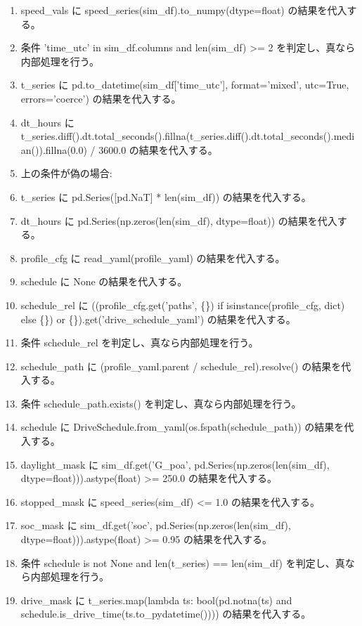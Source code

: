 \documentclass[a4paper,11pt]{article}
\begin{document}
            \begin{enumerate}[leftmargin=1.8em]
            \item speed\_vals に speed\_series(sim\_df).to\_numpy(dtype=float) の結果を代入する。
\item 条件 'time\_utc' in sim\_df.columns and len(sim\_df) >= 2 を判定し、真なら内部処理を行う。
\item   t\_series に pd.to\_datetime(sim\_df['time\_utc'], format='mixed', utc=True, errors='coerce') の結果を代入する。
\item   dt\_hours に t\_series.diff().dt.total\_seconds().fillna(t\_series.diff().dt.total\_seconds().median()).fillna(0.0) / 3600.0 の結果を代入する。
\item   上の条件が偽の場合:
\item   t\_series に pd.Series([pd.NaT] * len(sim\_df)) の結果を代入する。
\item   dt\_hours に pd.Series(np.zeros(len(sim\_df), dtype=float)) の結果を代入する。
\item profile\_cfg に read\_yaml(profile\_yaml) の結果を代入する。
\item schedule に None の結果を代入する。
\item schedule\_rel に ((profile\_cfg.get('paths', \{\}) if isinstance(profile\_cfg, dict) else \{\}) or \{\}).get('drive\_schedule\_yaml') の結果を代入する。
\item 条件 schedule\_rel を判定し、真なら内部処理を行う。
\item   schedule\_path に (profile\_yaml.parent / schedule\_rel).resolve() の結果を代入する。
\item   条件 schedule\_path.exists() を判定し、真なら内部処理を行う。
\item     schedule に DriveSchedule.from\_yaml(os.fspath(schedule\_path)) の結果を代入する。
\item daylight\_mask に sim\_df.get('G\_poa', pd.Series(np.zeros(len(sim\_df), dtype=float))).astype(float) >= 250.0 の結果を代入する。
\item stopped\_mask に speed\_series(sim\_df) <= 1.0 の結果を代入する。
\item soc\_mask に sim\_df.get('soc', pd.Series(np.zeros(len(sim\_df), dtype=float))).astype(float) >= 0.95 の結果を代入する。
\item 条件 schedule is not None and len(t\_series) == len(sim\_df) を判定し、真なら内部処理を行う。
\item   drive\_mask に t\_series.map(lambda ts: bool(pd.notna(ts) and schedule.is\_drive\_time(ts.to\_pydatetime()))) の結果を代入する。

\end{enumerate}
\end{document}
